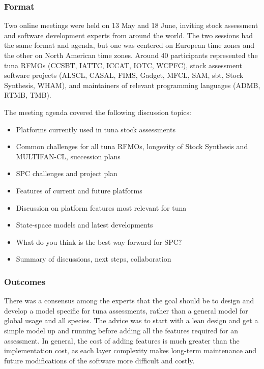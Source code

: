 \documentclass{SCreport}
\begin{document}
\subsubsection{Format}

Two online meetings were held on 13 May and 18 June, inviting stock assessment
and software development experts from around the world. The two sessions had the
same format and agenda, but one was centered on European time zones and the
other on North American time zones. Around 40 participants represented the tuna
RFMOs (CCSBT, IATTC, ICCAT, IOTC, WCPFC), stock assessment software projects
(ALSCL, CASAL, FIMS, Gadget, MFCL, SAM, sbt, Stock Synthesis, WHAM), and
maintainers of relevant programming languages (ADMB, RTMB, TMB).

The meeting agenda covered the following discussion topics:

\begin{itemize}
  \item Platforms currently used in tuna stock assessments\\[-4ex]
  \item Common challenges for all tuna RFMOs, longevity of Stock Synthesis and
  MULTIFAN-CL, succession plans\\[-4ex]
  \item SPC challenges and project plan\\[-4ex]
  \item Features of current and future platforms\\[-4ex]
  \item Discussion on platform features most relevant for tuna\\[-4ex]
  \item State-space models and latest developments\\[-4ex]
  \item What do you think is the best way forward for SPC?\\[-4ex]
  \item Summary of discussions, next steps, collaboration
\end{itemize}

\subsubsection{Outcomes}

There was a consensus among the experts that the goal should be to design and
develop a model specific for tuna assessments, rather than a general model for
global usage and all species. The advice was to start with a lean design and get
a simple model up and running before adding all the features required for an
assessment. In general, the cost of adding features is much greater than the
implementation cost, as each layer complexity makes long-term maintenance and
future modifications of the software more difficult and costly.
\end{document}
